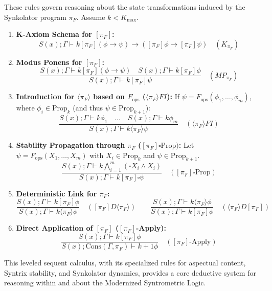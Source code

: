 \documentclass[
    12pt,              %
    a4paper,           %
    headings=normal,   %
    twoside=true,      %
    BCOR=8mm,          %
]{scrbook}
\newcommand{\BoxSyn}{\square}
\newcommand{\piF}{\pi_F}
\newcommand{\dynboxgen}[1]{[#1]}
\newcommand{\dyndiamondgen}[1]{\langle#1\rangle}
\newcommand{\turnstilek}[1][]{\vdash^{#1}}
\newcommand{\Kmax}{K_{\text{max}}}
\newcommand{\Propk}[1]{\text{Prop}_{#1}}
\newcommand{\fops}{F_{\text{ops}}}
\begin{document}
These rules govern reasoning about the state transformations induced by the Synkolator program \(\piF\). Assume \(k < \Kmax\).

\begin{enumerate}[label=\arabic*.]
    \item  \textbf{K-Axiom Schema for \(\dynboxgen{\pi_F}\):}
    \[ S(x); \Gamma \turnstilek{k} \dynboxgen{\pi_F}(\phi \rightarrow \psi) \rightarrow (\dynboxgen{\pi_F}\phi \rightarrow \dynboxgen{\pi_F}\psi) \quad (K_{\pi_F}) \]

    \item  \textbf{Modus Ponens for \(\dynboxgen{\pi_F}\):}
    \[ \frac{S(x); \Gamma \turnstilek{k} \dynboxgen{\pi_F}(\phi \rightarrow \psi) \quad S(x); \Gamma \turnstilek{k} \dynboxgen{\pi_F}\phi}{S(x); \Gamma \turnstilek{k} \dynboxgen{\pi_F}\psi} \quad (MP_{\pi_F}) \]

    \item  \textbf{Introduction for \(\dyndiamondgen{\pi_F}\) based on \(\fops\) (\(\dyndiamondgen{\pi_F} FI\)):}
    If \(\psi = \fops(\phi_1, \dots, \phi_m)\), where \(\phi_i \in \Propk{k}\) (and thus \(\psi \in \Propk{k+1}\)):
    \[ \frac{S(x); \Gamma \turnstilek{k} \phi_1 \quad \dots \quad S(x); \Gamma \turnstilek{k} \phi_m}{S(x); \Gamma \turnstilek{k} \dyndiamondgen{\pi_F}\psi} \quad (\dyndiamondgen{\pi_F} FI) \]

    \item  \textbf{Stability Propagation through \(\pi_F\) (\(\dynboxgen{\pi_F}\BoxSyn \text{Prop})\):}
    Let \(\psi = \fops(X_1, \dots, X_m)\) with \(X_i \in \Propk{k}\) and \(\psi \in \Propk{k+1}\).
    \[ \frac{S(x); \Gamma \turnstilek{k} \bigwedge_{i=1}^m (\BoxSyn X_i \land X_i)}{S(x); \Gamma \turnstilek{k} \dynboxgen{\pi_F}\BoxSyn\psi} \quad (\dynboxgen{\pi_F}\BoxSyn \text{Prop}) \]

    \item  \textbf{Deterministic Link for \(\pi_F\):}
    \[ \frac{S(x); \Gamma \turnstilek{k} \dynboxgen{\pi_F}\phi}{S(x); \Gamma \turnstilek{k} \dyndiamondgen{\pi_F}\phi} \quad (\dynboxgen{\pi_F} D \dyndiamondgen{\pi_F}) \qquad \frac{S(x); \Gamma \turnstilek{k} \dyndiamondgen{\pi_F}\phi}{S(x); \Gamma \turnstilek{k} \dynboxgen{\pi_F}\phi} \quad (\dyndiamondgen{\pi_F} D \dynboxgen{\pi_F}) \]

    \item  \textbf{Direct Application of \(\dynboxgen{\pi_F}\) (\(\dynboxgen{\pi_F}\)-Apply):}
    \[ \frac{S(x); \Gamma \turnstilek{k} \dynboxgen{\pi_F}\phi}{S(x); \text{Cons}(\Gamma, \pi_F) \turnstilek{k+1} \phi} \quad (\dynboxgen{\pi_F}\text{-Apply}) \]
\end{enumerate}
This leveled sequent calculus, with its specialized rules for aspectual content, Syntrix stability, and Synkolator dynamics, provides a core deductive system for reasoning within and about the Modernized Syntrometric Logic.
\end{document}
